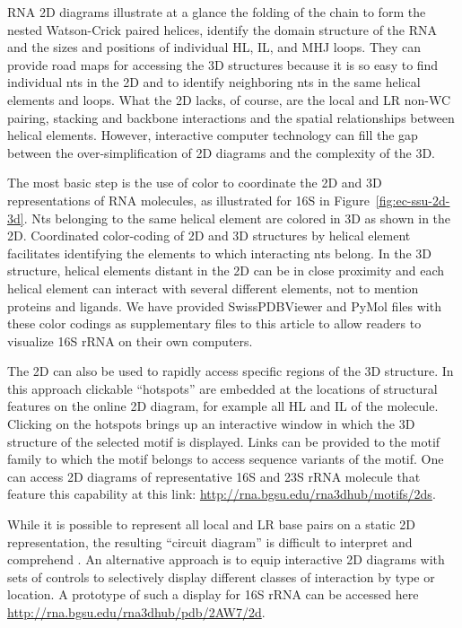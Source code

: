 RNA 2D diagrams illustrate at a glance the folding of the chain to form the
nested Watson-Crick paired helices, identify the domain structure of the RNA and
the sizes and positions of individual HL, IL, and MHJ loops. They can provide
road maps for accessing the 3D structures because it is so easy to find
individual nts in the 2D and to identify neighboring nts in the same helical
elements and loops. What the 2D lacks, of course, are the local and LR non-WC
pairing, stacking and backbone interactions and the spatial relationships
between helical elements. However, interactive computer technology can fill the
gap between the over-simplification of 2D diagrams and the complexity of the 3D. 

The most basic step is the use of color to coordinate the 2D and 3D
representations of RNA molecules, as illustrated for 16S in
Figure~\ref{fig:ec-ssu-2d-3d}. Nts belonging to the same helical element are
colored in 3D as shown in the 2D. Coordinated color-coding of 2D and 3D
structures by helical element facilitates identifying the elements to which
interacting nts belong. In the 3D structure, helical elements distant in the 2D
can be in close proximity and each helical element can interact with several
different elements, not to mention proteins and ligands.  We have provided
SwissPDBViewer and PyMol files with these color codings as supplementary files
to this article to allow readers to visualize \EC{} 16S rRNA on their own
computers. 

The 2D can also be used to rapidly access specific regions of the 3D structure.
In this approach clickable ``hotspots'' are embedded at the locations of
structural features on the online 2D diagram, for example all HL and IL of the
molecule. Clicking on the hotspots brings up an interactive window in which the
3D structure of the selected motif is displayed. Links can be provided to the
motif family to which the motif belongs to access sequence variants of the
motif. One can access 2D diagrams of representative 16S and 23S rRNA molecule
that feature this capability at this link:
\url{http://rna.bgsu.edu/rna3dhub/motifs/2ds}.

While it is possible to represent all local and LR base pairs on a static 2D
representation, the resulting ``circuit diagram'' is difficult to interpret and
comprehend \cite{Lescoute2006a}. An alternative approach is to equip interactive
2D diagrams with sets of controls to selectively display different classes of
interaction by type or location. A prototype of such a display for 16S rRNA can
be accessed here \url{http://rna.bgsu.edu/rna3dhub/pdb/2AW7/2d}.

